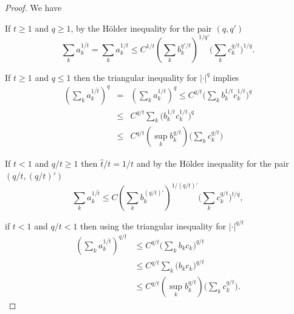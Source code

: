 \documentclass{amsart}
\theoremstyle{definition}
\begin{document}
\begin{proof}   We have 

  If $t\geq 1$ and $q\geq 1$, by the H\"older inequality for the pair $(q,q')$
$$\sum_{k} a_k^{1/\hat{t}}=\sum_k a_k^{1/t} \leq C^{1/t} (\sum_k b_k^{q'/t})^{1/q'}    \big(  \sum_k c_k^{q/t}\big)^{1/q}.$$


 If $t\geq 1$ and $q\leq 1$ then   the triangular inequality for $|\cdot|^q$ implies
\begin{eqnarray*}
(\sum_{k} a_k^{1/\hat{t}})^q&=&(\sum_k a_k^{1/t})^q \leq C^{q/t} \big(   \sum_k b_k^{1/t}c_k^{1/t}\big)^q \\
&\leq& C^{q/t}   \sum_k \big(  b_k^{1/t}c_k^{1/t}\big)^q  \\
&\leq& C^{q/t}   (\sup_k b_k^{q/t})\Big( \sum_kc_k^{q/t}\Big)
\end{eqnarray*}

 If $t< 1$ and $q/t \geq 1$ then $\hat{t}/t=1/t$ and by the  H\"older inequality for the pair $(q/t,(q/t)')$
$$\sum_{k} a_k^{1/\hat{t}}\leq C (\sum_k b_k^{(q/t)'})^{1/(q/t)'}    \big(  \sum_k c_k^{q/t}\big)^{t/q},$$

 if $t<  1$ and $q/t<  1$ then  using the triangular inequality for $|\cdot|^{q/t}$
\begin{align*} (\sum_k a_k^{1/\hat{t}})^{q/t} &\leq C^{q/t} \big(\sum_k  b_k c_k\big)^{q/t}\\
&\leq C^{q/t} \sum_k  \big(b_k c_k\big)^{q/t}\\
&\leq C^{q/t} (\sup_k b_k^{q/t}) \Big(  \sum_k c_k^{q/t}\Big). \end{align*} 
\end{proof}
\end{document}
